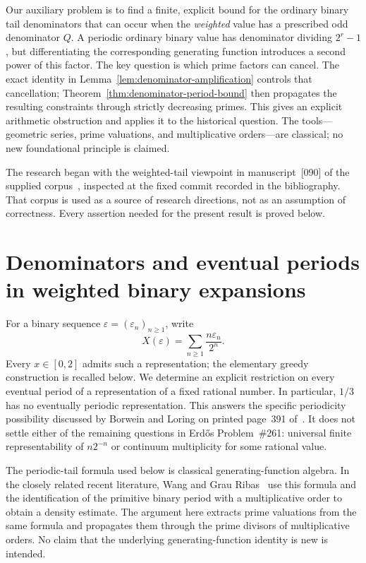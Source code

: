 \documentclass[11pt]{article}
\theoremstyle{definition}
\theoremstyle{remark}
\begin{document}
Our auxiliary problem is to find a finite, explicit bound for the
ordinary binary tail denominators that can occur when the \emph{weighted}
value has a prescribed odd denominator $Q$. A periodic ordinary binary value has denominator
dividing $2^r-1$, but differentiating the corresponding generating
function introduces a second power of this factor. The key question is
which prime factors can cancel. The exact identity in
Lemma~\ref{lem:denominator-amplification} controls that cancellation;
Theorem~\ref{thm:denominator-period-bound} then propagates the resulting
constraints through strictly decreasing primes. This gives an explicit arithmetic obstruction and applies it to the
historical question.
The tools---geometric series, prime valuations, and multiplicative
orders---are classical; no new foundational principle is claimed.

The research began with the weighted-tail viewpoint in manuscript~[090]
of the supplied corpus~\cite{Corpus090}, inspected at the fixed commit
recorded in the bibliography. That corpus is used as a source of research
directions, not as an assumption of correctness. Every assertion needed
for the present result is proved below.


\section{Denominators and eventual periods in weighted binary expansions}
\label{sec:weighted-periods}

For a binary sequence $\varepsilon=(\varepsilon_n)_{n\ge1}$, write
\[
 X(\varepsilon)=\sum_{n\ge1}\frac{n\varepsilon_n}{2^n}.
\]
Every $x\in[0,2]$ admits such a representation; the elementary greedy construction is recalled below. We determine an explicit restriction on every eventual period of a representation of a fixed rational number. In particular, $1/3$ has no eventually periodic representation. This answers the specific periodicity possibility discussed by Borwein and Loring on printed page~391 of~\cite{BL1990}. It does not settle either of the remaining questions in Erd\H{o}s Problem~\#261: universal finite representability of $n2^{-n}$ or continuum multiplicity for some rational value.

The periodic-tail formula used below is classical generating-function algebra. In the closely related recent literature, Wang and Grau Ribas~\cite[Lemma~A.12 and Propositions~7.2/A.15]{Wang2026v1} use this formula and the identification of the primitive binary period with a multiplicative order to obtain a density estimate. The argument here extracts prime valuations from the same formula and propagates them through the prime divisors of multiplicative orders. No claim that the underlying generating-function identity is new is intended.
\end{document}
